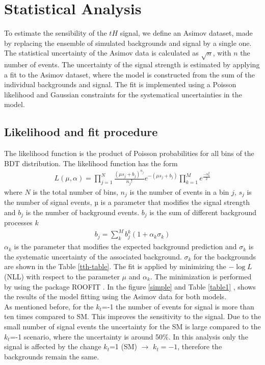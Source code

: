 \chapter{Statistical Analysis}
	To estimate the sensibility of the $tH$ signal, we define an Asimov dataset, made by replacing the ensemble of simulated backgrounds and signal by a single one. The statistical uncertainty of the Asimov data is calculated as $\sqrt{n}$, with $n$ the number of events. The uncertainty of the signal strength is estimated by applying a  fit to the Asimov dataset, where the model
	is constructed from the sum of the individual backgrounds and signal. The fit is implemented using a Poisson likelihood and Gaussian constraints for the systematical uncertainties in the model.
	
	
	\section{Likelihood and fit procedure}
	The likelihood function is the product of Poisson probabilities for all bins of the BDT distribution. The likelihood function has the form
	\begin{align}
		L(\mu,\alpha)=\prod_{j=1}^{N}\frac{(\mu s_j +b_j)^{n_j}}{n_j !}e^{-(\mu s_j+b_j)} \prod_{k=1}^M e^{\frac{-\alpha^2_k}{2}}
	\end{align}
	where $N$ is the total number of bins, $n_j$ is the number of events in a bin $j$,  $s_j$ is the number of signal events, µ is a parameter that modifies the signal strength and  $b_j$ is the number of background events.
	$b_j$ is the sum of different background processes $k$
	\begin{align}
		b_j=\sum_k^M b_j^k(1+ \alpha_k \sigma_k)
	\end{align}
	$\alpha_k$ is the parameter that modifies the expected background prediction and $\sigma_k$ is the systematic uncertainty of the associated background. $\sigma_k$ for the backgrounds are shown in the Table \ref{tth-table}.
	The fit is applied by minimizing the $-\log{L}$ (NLL) with respect to the parameter $\mu$ and $\alpha_k$. The minimization is performed by using the package ROOFIT \cite{roofit}. In the figure \ref{simple} and Table \ref{table1} , shows the results of the model fitting using the Asimov data for both models.  \\
	As mentioned before, for the $k_t$=-1 the number of events for signal is more than ten times compared to SM. This improves the sensitivity to the signal. Due to the small number of signal events the uncertainty for the SM is large compared to the $k_t$=-1 scenario, where the uncertainty is around 50$\%$. In this analysis only the signal is affected by the change $k_t$=1 (SM) $\rightarrow$  $k_t=-1$, therefore the backgrounds remain the same.
	
